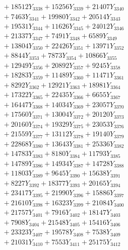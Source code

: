 \documentclass[a4paper,10pt]{article}
\begin{document}
{\begin{align}
&\;  + 18512 Y_{3338} + 15256 Y_{3339} + 21407 Y_{3340} \\[0.3ex]
&\;  + 7463 Y_{3341} + 19980 Y_{3342} + 20514 Y_{3343} \\[0.3ex]
&\;  + 19531 Y_{3344} + 11626 Y_{3345} + 24012 Y_{3346} \\[0.3ex]
&\;  + 21337 Y_{3347} + 7491 Y_{3348} + 6589 Y_{3349} \\[0.3ex]
&\;  + 13804 Y_{3350} + 22426 Y_{3351} + 13971 Y_{3352} \\[0.3ex]
&\;  + 8844 Y_{3353} + 7873 Y_{3354} + 10866 Y_{3355} \\[0.3ex]
&\;  + 12949 Y_{3356} + 20892 Y_{3357} + 9245 Y_{3358} \\[0.5ex]\allowbreak
&\;  + 18283 Y_{3359} + 11489 Y_{3360} + 11471 Y_{3361} \\[0.3ex]
&\;  + 8292 Y_{3362} + 12921 Y_{3363} + 18981 Y_{3364} \\[0.3ex]
&\;  + 17322 Y_{3365} + 22435 Y_{3366} + 6655 Y_{3367} \\[0.3ex]
&\;  + 16447 Y_{3368} + 14034 Y_{3369} + 23057 Y_{3370} \\[0.3ex]
&\;  + 17560 Y_{3371} + 13004 Y_{3372} + 20120 Y_{3373} \\[0.3ex]
&\;  + 20160 Y_{3374} + 19329 Y_{3375} + 23053 Y_{3376} \\[0.3ex]
&\;  + 21559 Y_{3377} + 13112 Y_{3378} + 19140 Y_{3379} \\[0.3ex]
&\;  + 22868 Y_{3380} + 13643 Y_{3381} + 25336 Y_{3382} \\[0.3ex]
&\;  + 14783 Y_{3383} + 8180 Y_{3384} + 11793 Y_{3385} \\[0.3ex]
&\;  + 14789 Y_{3386} + 14934 Y_{3387} + 14728 Y_{3388} \\[0.5ex]\allowbreak
&\;  + 11803 Y_{3389} + 9645 Y_{3390} + 15638 Y_{3391} \\[0.3ex]
&\;  + 8227 Y_{3392} + 18377 Y_{3393} + 20165 Y_{3394} \\[0.3ex]
&\;  + 23417 Y_{3395} + 21990 Y_{3396} + 15886 Y_{3397} \\[0.3ex]
&\;  + 21610 Y_{3398} + 16323 Y_{3399} + 21084 Y_{3400} \\[0.3ex]
&\;  + 21757 Y_{3401} + 7916 Y_{3402} + 18147 Y_{3403} \\[0.3ex]
&\;  + 7908 Y_{3404} + 21548 Y_{3405} + 15416 Y_{3406} \\[0.3ex]
&\;  + 23323 Y_{3407} + 19578 Y_{3408} + 7538 Y_{3409} \\[0.3ex]
&\;  + 21031 Y_{3410} + 7553 Y_{3411} + 25175 Y_{3412} \\[0.3ex]

\end{align}}
\end{document}
